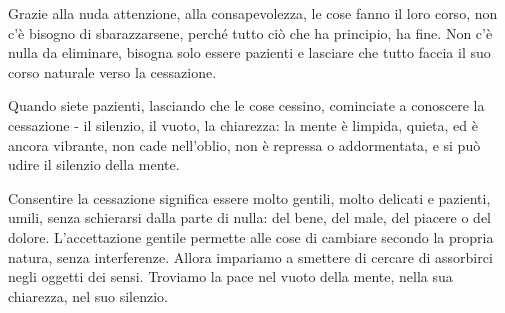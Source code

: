 Grazie alla nuda attenzione, alla consapevolezza, le cose fanno il loro
corso, non c'è bisogno di sbarazzarsene, perché tutto ciò che ha
principio, ha fine. Non c'è nulla da eliminare, bisogna solo essere
pazienti e lasciare che tutto faccia il suo corso naturale verso la
cessazione.

Quando siete pazienti, lasciando che le cose cessino, cominciate a
conoscere la cessazione - il silenzio, il vuoto, la chiarezza: la mente
è limpida, quieta, ed è ancora vibrante, non cade nell'oblio, non è
repressa o addormentata, e si può udire il silenzio della mente.

Consentire la cessazione significa essere molto gentili, molto delicati
e pazienti, umili, senza schierarsi dalla parte di nulla: del bene, del
male, del piacere o del dolore. L'accettazione gentile permette alle
cose di cambiare secondo la propria natura, senza interferenze. Allora
impariamo a smettere di cercare di assorbirci negli oggetti dei sensi.
Troviamo la pace nel vuoto della mente, nella sua chiarezza, nel suo
silenzio.


